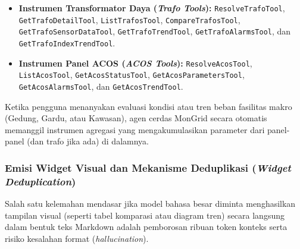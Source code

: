 \begin{enumerate}[label=\arabic*., leftmargin=*, itemsep=0pt]
\begin{itemize}[leftmargin=*, itemsep=0pt]
    \item \textbf{Instrumen Transformator Daya (\textit{Trafo Tools}):} \texttt{ResolveTrafoTool}, \texttt{GetTrafoDetailTool}, \texttt{ListTrafosTool}, \texttt{CompareTrafosTool}, \texttt{GetTrafoSensorDataTool}, \texttt{GetTrafoTrendTool}, \texttt{GetTrafoAlarmsTool}, dan \texttt{GetTrafoIndexTrendTool}.
    \item \textbf{Instrumen Panel ACOS (\textit{ACOS Tools}):} \texttt{ResolveAcosTool}, \texttt{ListAcosTool}, \texttt{GetAcosStatusTool}, \texttt{GetAcosParametersTool}, \texttt{GetAcosAlarmsTool}, dan \texttt{GetAcosTrendTool}.
  \end{itemize}
  Ketika pengguna menanyakan evaluasi kondisi atau tren beban fasilitas makro (Gedung, Gardu, atau Kawasan), agen cerdas MonGrid secara otomatis memanggil instrumen agregasi yang mengakumulasikan parameter dari panel-panel (dan trafo jika ada) di dalamnya.
\end{enumerate}

\subsubsection{Emisi Widget Visual dan Mekanisme Deduplikasi (\textit{Widget Deduplication})}

Salah satu kelemahan mendasar jika model bahasa besar diminta menghasilkan tampilan visual (seperti tabel komparasi atau diagram tren) secara langsung dalam bentuk teks Markdown adalah pemborosan ribuan token konteks serta risiko kesalahan format (\textit{hallucination}).


